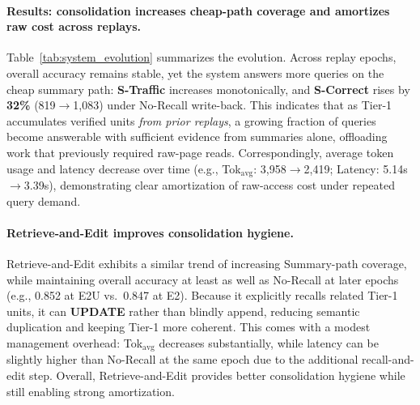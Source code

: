\documentclass{article}
\theoremstyle{plain}
\theoremstyle{definition}
\theoremstyle{remark}
\begin{document}
\paragraph{Results: consolidation increases cheap-path coverage and amortizes raw cost across replays.}
Table~\ref{tab:system_evolution} summarizes the evolution.
Across replay epochs, overall accuracy remains stable, yet the system answers more queries on the cheap summary path:
\textbf{S-Traffic} increases monotonically, and \textbf{S-Correct} rises by \textbf{32\%} (819$\to$1{,}083) under No-Recall write-back.
This indicates that as Tier-1 accumulates verified units \emph{from prior replays}, a growing fraction of queries become answerable with sufficient evidence from summaries alone, offloading work that previously required raw-page reads.
Correspondingly, average token usage and latency decrease over time (e.g., Tok$_{\text{avg}}$: 3{,}958$\to$2{,}419; Latency: 5.14s$\to$3.39s), demonstrating clear amortization of raw-access cost under repeated query demand.

\paragraph{Retrieve-and-Edit improves consolidation hygiene.}
Retrieve-and-Edit exhibits a similar trend of increasing Summary-path coverage, while maintaining overall accuracy at least as well as No-Recall at later epochs (e.g., 0.852 at E2U vs.\ 0.847 at E2).
Because it explicitly recalls related Tier-1 units, it can \textbf{UPDATE} rather than blindly append, reducing semantic duplication and keeping Tier-1 more coherent.
This comes with a modest management overhead: Tok$_{\text{avg}}$ decreases substantially, while latency can be slightly higher than No-Recall at the same epoch due to the additional recall-and-edit step.
Overall, Retrieve-and-Edit provides better consolidation hygiene while still enabling strong amortization.





\end{document}
